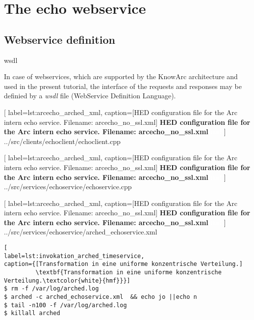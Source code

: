 \chapter{The echo webservice}

\section{Webservice definition}
wsdl

In case of webservices, which are supported by the KnowArc architecture and used in the present tutorial, the interface of the requests and responses may be definied by a \textit{wsdl} file (WebService Definition Language).









	[
	label=lst:arcecho_arched_xml,
	caption={[HED configuration file for the Arc intern echo service. Filename: arcecho\_no\_ssl.xml]
	\textbf{HED configuration file for the Arc intern echo service. Filename: arcecho\_no\_ssl.xml\textcolor{white}{hmf}}}
	]
{../src/clients/echoclient/echoclient.cpp}



	[
	label=lst:arcecho_arched_xml,
	caption={[HED configuration file for the Arc intern echo service. Filename: arcecho\_no\_ssl.xml]
	\textbf{HED configuration file for the Arc intern echo service. Filename: arcecho\_no\_ssl.xml\textcolor{white}{hmf}}}
	]
{../src/services/echoservice/echoservice.cpp}




\begin{minipage}[t]{\textwidth}

	[
	label=lst:arcecho_arched_xml,
	caption={[HED configuration file for the Arc intern echo service. Filename: arcecho\_no\_ssl.xml]
	\textbf{HED configuration file for the Arc intern echo service. Filename: arcecho\_no\_ssl.xml\textcolor{white}{hmf}}}
	]
{../src/services/echoservice/arched_echoservice.xml}
\end{minipage}



\begin{minipage}[t]{\textwidth}
\begin{lstlisting}[
label=lst:invokation_arched_timeservice,
caption={[Transformation in eine uniforme konzentrische Verteilung.]
         \textbf{Transformation in eine uniforme konzentrische Verteilung.\textcolor{white}{hmf}}}]
$ rm -f /var/log/arched.log
$ arched -c arched_echoservice.xml  && echo jo ||echo n
$ tail -n100 -f /var/log/arched.log
$ killall arched
\end{lstlisting}
\end{minipage}



